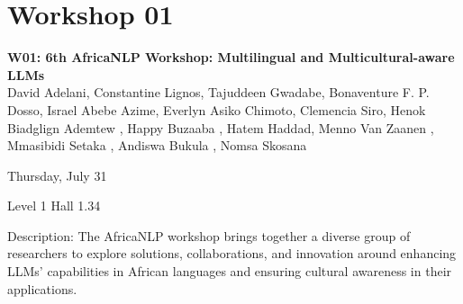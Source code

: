 
\clearpage



\section[W01: 6th AfricaNLP Workshop: Multilingual and Multicultural-aware LLMs]{Workshop 01}
\label{workshop_1}

\begin{center}
    {\Large \textbf{W01: 6th AfricaNLP Workshop: Multilingual and Multicultural-aware LLMs}}\\
    

    David Adelani, Constantine Lignos, Tajuddeen Gwadabe, Bonaventure F. P. Dosso, Israel Abebe Azime, Everlyn Asiko Chimoto, Clemencia Siro, Henok Biadglign Ademtew , Happy Buzaaba , Hatem Haddad, Menno Van Zaanen , Mmasibidi Setaka , Andiswa Bukula , Nomsa Skosana

    Thursday, July 31
    
    Level 1 Hall 1.34

\end{center}

Description: The AfricaNLP workshop brings together a diverse group of researchers to explore solutions, collaborations, and innovation around enhancing LLMs’ capabilities in African languages and ensuring cultural awareness in their applications. 

